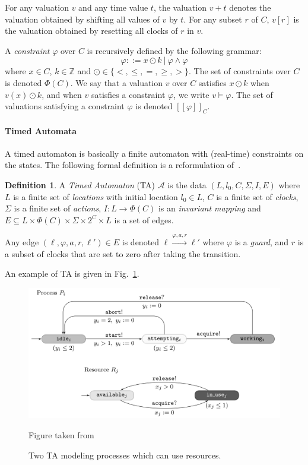 \documentclass[11pt]{article}
\theoremstyle{definition}
\newtheorem{definition}{Definition}
\theoremstyle{remark}
\begin{document}
For any valuation $v$ and any time value $t$, the valuation $v + t$ denotes the valuation obtained by shifting all values of $v$ by $t$. For any subset $r$ of $C$, $v[r]$ is the valuation obtained by resetting all clocks of $r$ in $v$.

A \emph{constraint} $\varphi$ over $C$ is recursively defined by the following grammar:
\begin{equation*}
	\varphi ::= x \odot k\ |\ \varphi \land \varphi
\end{equation*}
where $x\in C$, $k \in \mathbb{Z}$ and $\odot \in \{<, \leq, =, \geq, >\}$.
The set of constraints over $C$ is denoted $\Phi(C)$.
We say that a valuation $v$ over $C$ satisfies $x \odot k$ when $v(x) \odot k$, and when $v$ satisfies a constraint $\varphi$, we write $v \models \varphi$. The set of valuations satisfying a constraint $\varphi$ is denoted $[\![\varphi]\!]_C$.


\paragraph{Timed Automata}\label{par:ta}
A timed automaton is basically a finite automaton with (real-time) constraints on the states.
The following formal definition is a reformulation of~\cite[Chapter 29.2, Definition 1]{handbook}.
\begin{definition}\label{def:ta}
	A \emph{Timed Automaton} (TA) $\mathcal{A}$ is the data $(L, l_0, C, \Sigma, I, E)$ where
	$L$ is a finite set of \emph{locations} with initial location $l_0 \in L$,
	$C$ is a finite set of \emph{clocks},
	$\Sigma$ is a finite set of \emph{actions},
	$I \colon L \to \Phi(C)$ is an \emph{invariant mapping} and
	$E \subseteq L \times \Phi(C) \times \Sigma \times 2^{C} \times L$ is a set of edges.

	Any edge $(\ell, \varphi, a, r, \ell') \in E$ is denoted $\ell \xrightarrow{\varphi, a, r} \ell'$ where $\varphi$ is a \emph{guard}, and $r$ is a subset of clocks that are set to zero after taking the transition.
\end{definition}
An example of TA is given in Fig.~\ref{fig:ta_ex}.

\begin{figure}[ht]
\centering
\includegraphics[width=.75\textwidth]{../img/TAex.png}
\caption{Two TA modeling processes which can use resources.}\label{fig:ta_ex}
\tiny{Figure taken from \cite[Chapter 29.2]{handbook}}
\end{figure}
\end{document}
